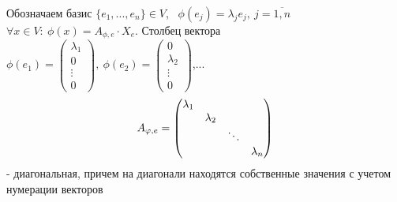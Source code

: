     Обозначаем базис $\{e_1,...,e_n\} \in V$, \ $\phi(e_j) = \lambda_j e_j, \ j = \overline{1,n}$  \\
    $\forall x \in V: \ \phi(x) = A_{\phi,e}\cdot X_e$. Столбец вектора $\phi(e_1) = \left(\begin{smallmatrix}
        \lambda_1 \\ 0 \\ \vdots \\ 0
    \end{smallmatrix}\right), \ \phi(e_2) = \left(\begin{smallmatrix}
        0 \\ \lambda_2 \\ \vdots \\ 0
    \end{smallmatrix}\right)$,...
    $$A_{\phi, e} = \begin{pmatrix}
        \lambda_1 & \null & \null & \null \\
        \null & \lambda_2 & \null & \null \\
        \null & \null & \ddots & \null\\
        \null & \null & \null & \lambda_n
    \end{pmatrix}$$
    - диагональная, причем на диагонали находятся собственные значения с учетом нумерации векторов
